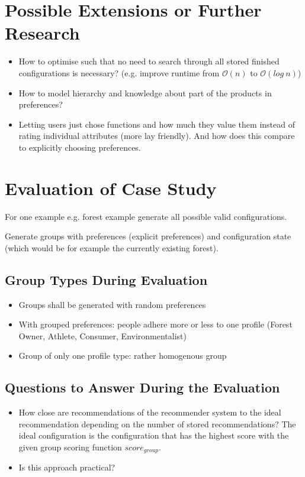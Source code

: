 \documentclass{article}
\begin{document}
\section{Possible Extensions or Further Research}

\begin{itemize}
    \item How to optimise such that no need to search through all stored finished configurations is necessary? (e.g. improve runtime from $\mathcal{O}(n)$ to $\mathcal{O}(log\ n)$)
    \item How to model hierarchy and knowledge about part of the products in preferences?
    \item Letting users just chose functions and how much they value them instead of rating individual attributes (more lay friendly). And how does this compare to explicitly choosing preferences.
\end{itemize}
    
    
\section{Evaluation of Case Study}

For one example e.g. forest example generate all possible valid configurations.

Generate groups with preferences (explicit preferences) and configuration state (which would be for example the currently existing forest).

\subsection{Group Types During Evaluation}
\begin{itemize}
    \item Groups shall be generated with random preferences
    \item With grouped preferences: people adhere more or less to one profile (Forest Owner, Athlete, Consumer, Environmentalist)
    \item Group of only one profile type: rather homogenous group
\end{itemize}

\subsection{Questions to Answer During the Evaluation}

\begin{itemize}
    \item How close are recommendations of the recommender system to the ideal recommendation depending on the number of stored recommendations? The ideal configuration is the configuration that has the highest score with the given group scoring function $score_{group}$.
    \item Is this approach practical?
\end{itemize}
\end{document}
